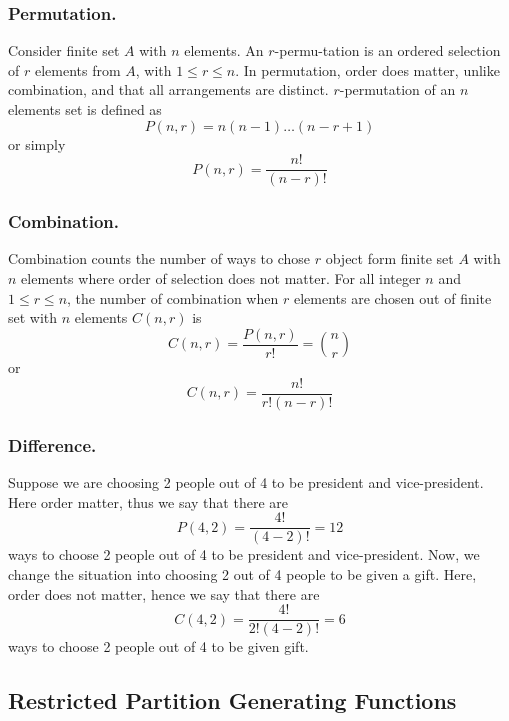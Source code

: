\documentclass[../../../main.tex]{subfiles}
\begin{document}
\subsubsection{Permutation.} Consider finite set $A$ with $n$ elements. An $r$-permu-tation is an ordered selection of $r$ elements from $A$, with $1\leq r\leq n$. In permutation, order does matter, unlike combination, and that all arrangements are distinct. $r$-permutation of an $n$ elements set is defined as
\begin{equation*}
    P(n,r)=n(n-1)\dots(n-r+1)
\end{equation*}
or simply
\begin{equation*}
    P(n,r)=\frac{n!}{(n-r)!}
\end{equation*}

\subsubsection{Combination.} Combination counts the number of ways to chose $r$ object form finite set $A$ with $n$ elements where order of selection does not matter. For all integer $n$ and $1\leq r\leq n$, the number of combination when $r$ elements are chosen out of finite set with $n$ elements $C(n,r)$ is
\begin{equation*}
    C(n,r)=\frac{P(n,r)}{r!}={n \choose r }
\end{equation*}
or
\begin{equation*}
    C(n,r)=\frac{n!}{r!(n-r)!}
\end{equation*}

\subsubsection{Difference.} Suppose we are choosing 2 people out of 4 to be president and vice-president. Here order matter, thus we say that there are
\begin{equation*}
    P(4,2)=\frac{4!}{(4-2)!}=12
\end{equation*}
ways to choose 2 people out of 4 to be president and vice-president. Now, we change the situation into choosing 2 out of 4 people to be given a gift. Here, order does not matter, hence we say that there are
\begin{equation*}
    C(4,2)=\frac{4!}{2!(4-2)!}=6
\end{equation*}
ways to choose 2 people out of 4 to be given gift.

\subsection{Restricted Partition Generating Functions}
\end{document}
